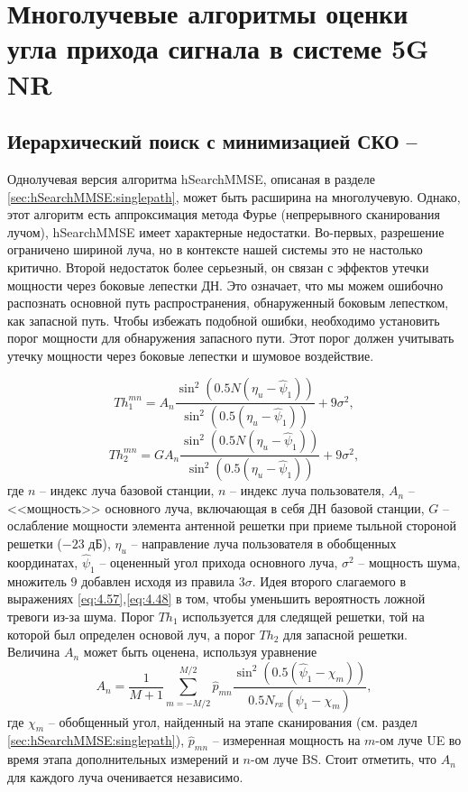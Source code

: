 \section{Многолучевые алгоритмы оценки угла прихода сигнала в системе 5G NR}
\subsection[Иерархический поиск с минимизацией СКО]{Иерархический поиск с минимизацией СКО -- \hSearchMMSE}
\label{sec:hSearchMMSE:multipath}

Однолучевая версия алгоритма hSearchMMSE, описаная в разделе
\ref{sec:hSearchMMSE:singlepath},
может быть расширина на многолучевую.  Однако, этот алгоритм есть аппроксимация
метода Фурье (непрерывного сканирования лучом), hSearchMMSE имеет характерные
недостатки.
Во-первых, разрешение ограничено шириной луча, но в контексте нашей
системы это не настолько критично. Второй недостаток более серьезный, он связан
с эффектов утечки мощности через боковые лепестки ДН.  Это означает, что мы
можем ошибочно распознать основной путь распространения, обнаруженный боковым
лепестком, как запасной путь.  Чтобы избежать подобной ошибки, необходимо
установить порог мощности для обнаружения запасного пути. Этот порог должен
учитывать утечку мощности через боковые лепестки и шумовое воздействие.

\begin{equation}
    \label{eq:4.57}
    Th_1^{mn} = A_n
    \frac
    {\sin^2(0.5 N (\eta_u - \hat \psi_1))}
    {\sin^2(0.5 (\eta_u - \hat \psi_1))} + 9 \sigma^2,
\end{equation}
\begin{equation}
    \label{eq:4.58}
    Th_2^{mn} = G A_n \frac{\sin^2(0.5 N (\eta_u - \hat \psi_1))}
    {\sin^2(0.5 (\eta_u - \hat \psi_1))} + 9 \sigma^2,
\end{equation}
где $n$ -- индекс луча базовой станции, $n$ -- индекс луча пользователя, $A_n$
-- <<мощность>> основного луча, включающая в себя ДН базовой станции, $G$ --
ослабление мощности элемента антенной решетки при приеме тыльной стороной
решетки ($-23$ дБ), $\eta_u$ -- направление луча пользователя в обобщенных
координатах, $\hat \psi_1$ -- оцененный угол прихода основного луча, $\sigma^2$
-- мощность шума, множитель $9$ добавлен исходя из правила $3\sigma$.
Идея второго слагаемого в выражениях \eqref{eq:4.57},\eqref{eq:4.48} в том,
чтобы уменьшить вероятность ложной тревоги из-за шума.
Порог $Th_1$ используется
для следящей решетки, той на которой был определен основой луч, а порог $Th_2$
для запасной решетки.  Величина $A_n$ может быть оценена, используя уравнение
\begin{equation}
      \label{eq:4.59}
    A_n = \frac{1}{M+1} \sum\limits_{m=-M/2}^{M/2} \hat p_{mn}
    \frac{\sin^2(0.5(\hat \psi_1 - \chi_m))}{0.5 N_{rx}(\hat \psi_1 - \chi_m)},
\end{equation}
где $\chi_m$ -- обобщенный угол, найденный на этапе сканирования
(см. раздел \eqref{sec:hSearchMMSE:singlepath}), $\hat p_{mn}$ --
измеренная мощность на $m$-ом луче UE во время этапа дополнительных измерений и
$n$-ом луче BS.
Стоит отметить, что $A_n$ для каждого луча оченивается независимо.

